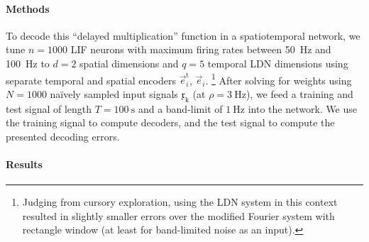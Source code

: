 \paragraph{Methods}
To decode this \enquote{delayed multiplication} function in a spatiotemporal network, we tune $n = 1000$ LIF neurons with maximum firing rates between \SI{50}{\hertz} and \SI{100}{\hertz} to $d = 2$ spatial dimensions and $q = 5$ temporal LDN dimensions using separate temporal and spatial encoders $\vec e_i^\mathrm{t}$, $\vec e_i$.%
\footnote{Judging from cursory exploration, using the LDN system in this context resulted in slightly smaller errors over the modified Fourier system with rectangle window (at least for band-limited noise as an input).}
After solving for weights using $N = 1000$ na\"ively sampled input signals $\mathfrak{x}_\mathrm{k}$ (at $\rho = \SI{3}{\hertz}$), we feed a training and test signal of length $T = \SI{100}{\second}$ and a band-limit of $\SI{1}{\hertz}$ into the network.
We use the training signal to compute decoders, and the test signal to compute the presented decoding errors.

\paragraph{Results}


